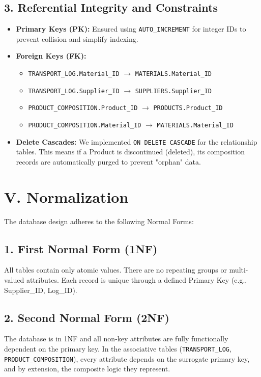 \documentclass[12pt,a4paper]{article}
\begin{document}
\subsection*{3. Referential Integrity and Constraints}
\begin{itemize}
    \item \textbf{Primary Keys (PK):} Ensured using \texttt{AUTO\_INCREMENT} for integer IDs to prevent collision and simplify indexing.
    \item \textbf{Foreign Keys (FK):} 
    \begin{itemize}
        \item \texttt{TRANSPORT\_LOG.Material\_ID} $\rightarrow$ \texttt{MATERIALS.Material\_ID}
        \item \texttt{TRANSPORT\_LOG.Supplier\_ID} $\rightarrow$ \texttt{SUPPLIERS.Supplier\_ID}
        \item \texttt{PRODUCT\_COMPOSITION.Product\_ID} $\rightarrow$ \texttt{PRODUCTS.Product\_ID}
        \item \texttt{PRODUCT\_COMPOSITION.Material\_ID} $\rightarrow$ \texttt{MATERIALS.Material\_ID}
    \end{itemize}
    \item \textbf{Delete Cascades:} We implemented \texttt{ON DELETE CASCADE} for the relationship tables. This means if a Product is discontinued (deleted), its composition records are automatically purged to prevent "orphan" data.
\end{itemize}

\newpage

\section*{V. Normalization}

The database design adheres to the following Normal Forms:

\subsection*{1. First Normal Form (1NF)}
All tables contain only atomic values. There are no repeating groups or multi-valued attributes. Each record is unique through a defined Primary Key (e.g., Supplier\_ID, Log\_ID).

\subsection*{2. Second Normal Form (2NF)}
The database is in 1NF and all non-key attributes are fully functionally dependent on the primary key. In the associative tables (\texttt{TRANSPORT\_LOG}, \texttt{PRODUCT\_COMPOSITION}), every attribute depends on the surrogate primary key, and by extension, the composite logic they represent.
\end{document}
